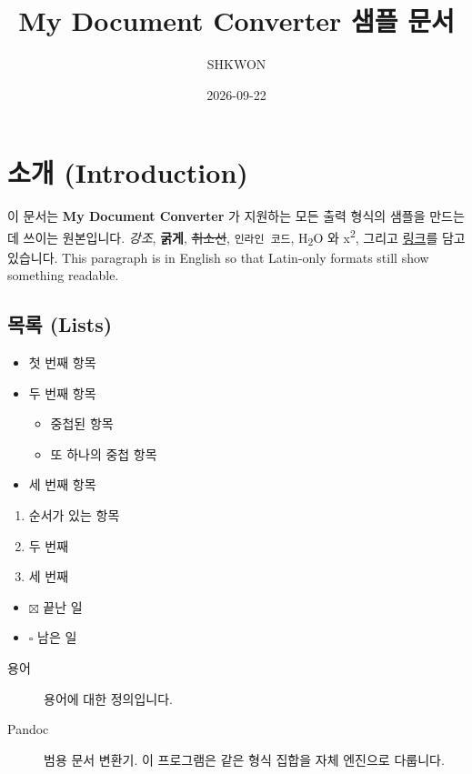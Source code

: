 \documentclass[11pt]{article}
\title{My Document Converter 샘플 문서}
\author{SHKWON}
\date{2026-09-22}
\begin{document}
\maketitle

\section*{소개 (Introduction)}\label{소개-introduction}

이 문서는 \textbf{My Document Converter} 가 지원하는 모든 출력 형식의 샘플을 만드는 데 쓰이는
원본입니다.
\emph{강조}, \textbf{굵게}, \sout{취소선}, \verb|인라인 코드|, H\textsubscript{2}O 와
x\textsuperscript{2}, 그리고
\href{https://example.com}{링크}를 담고 있습니다. This paragraph is in
English so that Latin-only formats still show something readable.

\subsection*{목록 (Lists)}\label{목록-lists}

\begin{itemize}
\item 첫 번째 항목
\item 두 번째 항목
\begin{itemize}
\item 중첩된 항목
\item 또 하나의 중첩 항목
\end{itemize}
\item 세 번째 항목
\end{itemize}

\begin{enumerate}
\item 순서가 있는 항목
\item 두 번째
\item 세 번째
\end{enumerate}

\begin{itemize}
\item $\boxtimes$ 끝난 일
\item $\square$ 남은 일
\end{itemize}

\begin{description}
\item[용어] 용어에 대한 정의입니다.
\item[Pandoc] 범용 문서 변환기. 이 프로그램은 같은 형식 집합을 자체 엔진으로 다룹니다.
\end{description}
\end{document}
